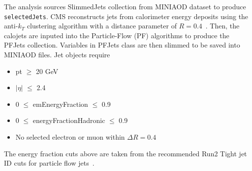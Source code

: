 The analysis sources SlimmedJets collection from MINIAOD dataset to produce {\tt selectedJets}.
CMS reconstructs jets from calorimeter energy deposits using the
anti-$k_T$ clustering algorithm with a distance parameter of $R=0.4$~\cite{Cacciari:2008gp}.
Then, the calojets are inputed into the Particle-Flow (PF) algorithms to produce the PFJets collection. Variables in PFJets class are then slimmed to be saved into MINIAOD files. 
Jet objects require
\begin{itemize}
  \item pt $\geq$ 20 GeV
  \item $|\eta|$ $\leq$ 2.4
  \item 0 $\leq$ emEnergyFraction $\leq$ 0.9
  \item 0 $\leq$ energyFractionHadronic $\leq$ 0.9
  \item No selected electron or muon within $\Delta R=0.4$
\end{itemize}
The energy fraction cuts above are taken from the recommended Run2 Tight jet ID
cuts for particle flow jets~\cite{jetid_2018}.
